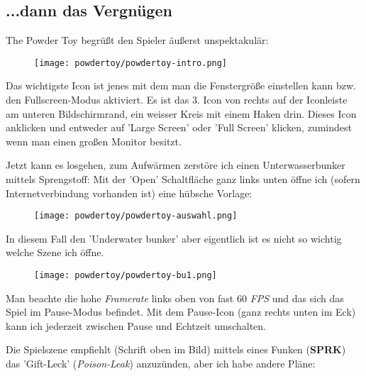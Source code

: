 

\subsection*{...dann das Vergnügen}

The Powder Toy begrüßt den Spieler äußerst unspektakulär:
\begin{figure}
\texttt{[image: powdertoy/powdertoy-intro.png]}
\end{figure}

Das wichtigste Icon ist jenes mit dem man die Fenstergröße einstellen kann bzw. den Fullscreen-Modus aktiviert. Es ist das 3. Icon von rechts auf der Iconleiste am unteren Bildschirmrand, ein weisser Kreis mit einem Haken drin. Dieses Icon anklicken und entweder auf 'Large Screen' oder 'Full Screen' klicken, zumindest wenn man einen großen Monitor besitzt. 

Jetzt kann es losgehen, zum Aufwärmen zerstöre ich einen Unterwasserbunker mittels Sprengstoff:
Mit der 'Open' Schaltfläche ganz links unten öffne ich (sofern Internetverbindung vorhanden ist) eine hübsche Vorlage:
\begin{figure}
\texttt{[image: powdertoy/powdertoy-auswahl.png]}
\end{figure}

In diesem Fall den 'Underwater bunker' aber eigentlich ist es nicht so wichtig welche Szene ich öffne.
\begin{figure}
\texttt{[image: powdertoy/powdertoy-bu1.png]}
\end{figure}
Man beachte die hohe \textit{Framerate} links oben von fast 60 \textit{FPS} und das sich das Spiel im Pause-Modus befindet. Mit dem Pause-Icon (ganz rechts unten im Eck) kann ich jederzeit zwischen Pause und Echtzeit umschalten.

Die Spielszene empfiehlt (Schrift oben im Bild) mittels eines Funken (\textbf{SPRK}) das 'Gift-Leck' (\textit{Poison-Leak}) anzuzünden, aber ich habe andere Pläne:


